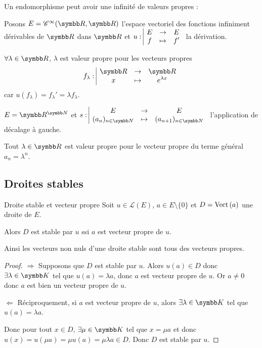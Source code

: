 Un endomorphisme peut avoir une infinité de valeurs propres :


\begin{exemple}
    Posons $E = \mathscr C^\infty(\R, \R)$ l'espace vectoriel des fonctions 
    infiniment dérivables de $\R$ dans $\R$ et $u: \space \begin{array}{|ccc} \displaystyle E & \to & \displaystyle E \\ \displaystyle f & \mapsto & \displaystyle f' \end{array}$ la dérivation. 

    $\forall \lambda \in \R$, $\lambda$ est valeur propre pour les vecteurs propres 
    $$\fonction{f_\lambda}{\R}{\R}{x}{e^{\lambda x}}$$ car
    $u(f_\lambda) = f_\lambda' = \lambda f_\lambda$.
\end{exemple}

\begin{exemple}
    $E = \R^{\N}$ et $\fonction s E E {(a_n)_{n \in \N}}{(a_{n + 1})_{n \in \N}}$ l'application de décalage à gauche.

    Tout $\lambda \in \R$ est valeur propre pour le vecteur propre du terme général $a_n = \lambda^n$.
\end{exemple}

\subsection{Droites stables }

\begin{proposition}{Droite stable et vecteur propre}{}
    Soit $u \in \mathscr L(E)$, $a \in E \setminus \{0\}$ et $D = \operatorname{Vect} \,(a)$ une droite de $E$. 

    Alors $D$ est stable par $u$ ssi $a$ est vecteur propre de $u$.

    Ainsi les vecteurs non nuls d'une droite stable sont tous des vecteurs propres. 
\end{proposition}

\begin{proof}
    $\Rightarrow$ Supposons que $D$ est stable par $u$. Alors $u(a) \in D$ donc 
    $\exists \lambda \in \K$ tel que $u(a) = \lambda a$, donc $a$ est vecteur propre de $u$.
    Or $a \neq 0$ donc $a$ est bien un vecteur propre de $u$.

    \lvspace $\Leftarrow$ Réciproquement, si $a$ est vecteur propre de $u$, alors 
    $\exists \lambda \in \K$ tel que $u(a) = \lambda a$. 

    Donc pour tout $x \in D$, $\exists \mu \in \K$ tel que $x = \mu a$ et donc 
    $u(x) = u(\mu a) = \mu u(a) = \mu \lambda a \in D$. Donc $D$ est stable par $u$.
\end{proof}

